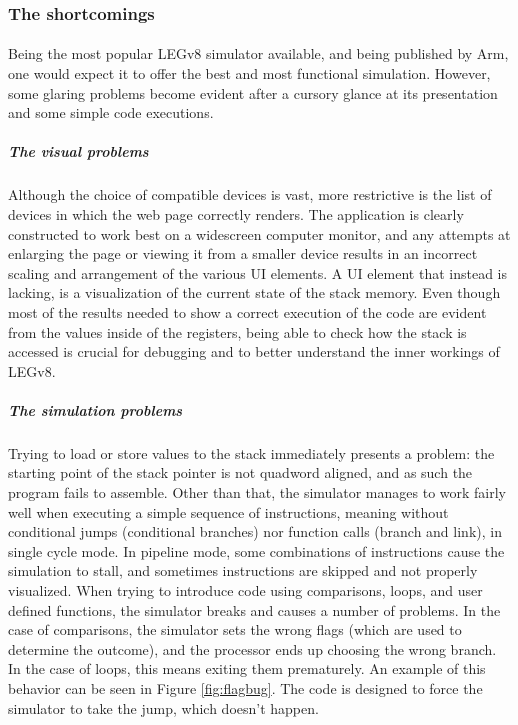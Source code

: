 \subsubsection{The shortcomings}
\paragraph{}
Being the most popular LEGv8 simulator available, and being published by Arm, one would expect it to offer the best and most functional simulation. However, some glaring problems become evident after a cursory glance at its presentation and some simple code executions.
\subparagraph{The visual problems}
Although the choice of compatible devices is vast, more restrictive is the list of devices in which the web page correctly renders. The application is clearly constructed to work best on a widescreen computer monitor, and any attempts at enlarging the page or viewing it from a smaller device results in an incorrect scaling and arrangement of the various UI elements. A UI element that instead is lacking, is a visualization of the current state of the stack memory. Even though most of the results needed to show a correct execution of the code are evident from the values inside of the registers, being able to check how the stack is accessed is crucial for debugging and to better understand the inner workings of LEGv8.
\subparagraph{The simulation problems}
Trying to load or store values to the stack immediately presents a problem: the starting point of the stack pointer is not quadword aligned, and as such the program fails to assemble. Other than that, the simulator manages to work fairly well when executing a simple sequence of instructions, meaning without conditional jumps (conditional branches) nor function calls (branch and link), in single cycle mode. In pipeline mode, some combinations of instructions cause the simulation to stall, and sometimes instructions are skipped and not properly visualized. When trying to introduce code using comparisons, loops, and user defined functions, the simulator breaks and causes a number of problems. In the case of comparisons, the simulator sets the wrong flags (which are used to determine the outcome), and the processor ends up choosing the wrong branch. In the case of loops, this means exiting them prematurely. An example of this behavior can be seen in Figure \ref{fig:flagbug}. The code is designed to force the simulator to take the jump, which doesn't happen.
